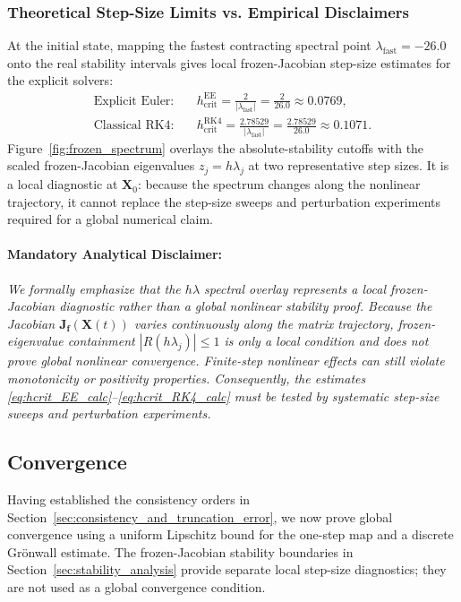 \subsubsection{Theoretical Step-Size Limits vs. Empirical Disclaimers}
At the initial state, mapping the fastest contracting spectral point $\lambda_{\mathrm{fast}}=-26.0$ onto the real stability intervals gives local frozen-Jacobian step-size estimates for the explicit solvers:
\begin{align}
\text{Explicit Euler:} \quad & h_{\mathrm{crit}}^{\mathrm{EE}} = \frac{2}{|\lambda_{\mathrm{fast}}|} = \frac{2}{26.0} \approx 0.0769, \label{eq:hcrit_EE_calc} \\
\text{Classical RK4:} \quad & h_{\mathrm{crit}}^{\mathrm{RK4}} = \frac{2.78529}{|\lambda_{\mathrm{fast}}|} = \frac{2.78529}{26.0} \approx 0.1071. \label{eq:hcrit_RK4_calc}
\end{align}
Figure~\ref{fig:frozen_spectrum} overlays the absolute-stability cutoffs
with the scaled frozen-Jacobian eigenvalues $z_j=h\lambda_j$ at two
representative step sizes. It is a local diagnostic at $\mathbf{X}_0$:
because the spectrum changes along the nonlinear trajectory, it cannot
replace the step-size sweeps and perturbation experiments required for a
global numerical claim.

\paragraph{Mandatory Analytical Disclaimer:}
\emph{We formally emphasize that the $h\lambda$ spectral overlay represents a local frozen-Jacobian diagnostic rather than a global nonlinear stability proof. Because the Jacobian $\mathbf{J}_{\mathbf{f}}(\mathbf{X}(t))$ varies continuously along the matrix trajectory, frozen-eigenvalue containment $|R(h\lambda_j)| \le 1$ is only a local condition and does not prove global nonlinear convergence. Finite-step nonlinear effects can still violate monotonicity or positivity properties. Consequently, the estimates \eqref{eq:hcrit_EE_calc}--\eqref{eq:hcrit_RK4_calc} must be tested by systematic step-size sweeps and perturbation experiments.}

\subsection{Convergence}

\label{sec:convergence}

Having established the consistency orders in
Section~\ref{sec:consistency_and_truncation_error}, we now prove global
convergence using a uniform Lipschitz bound for the one-step map and a
discrete Gr\"onwall estimate. The frozen-Jacobian stability boundaries in
Section~\ref{sec:stability_analysis} provide separate local step-size
diagnostics; they are not used as a global convergence condition.

